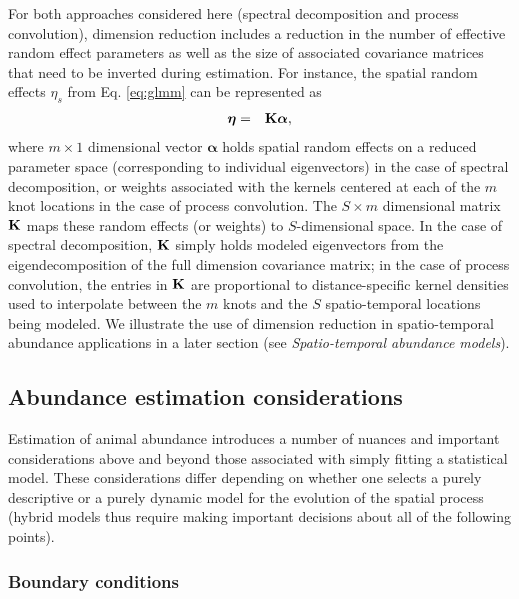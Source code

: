 \documentclass[12pt,english]{article}
\begin{document}
\begin{spacing}{1.9}
For both approaches considered here (spectral decomposition and process convolution), dimension reduction includes a reduction in the number of effective random effect parameters as well as the size of associated covariance matrices that need to be inverted during estimation.  For instance, the spatial random effects $\eta_s$ from Eq. \ref{eq:glmm} can be represented as
\begin{eqnarray}
   \boldsymbol{\eta} & = & {\bf K} \boldsymbol{\alpha},
 \label{eq:reduced-spat}
\end{eqnarray}
where $m \times 1$ dimensional vector $\boldsymbol{\alpha}$ holds spatial random effects on a reduced parameter space (corresponding to individual eigenvectors) in the case of spectral decomposition, or weights associated with the kernels centered at each of the $m$ knot locations in the case of process convolution. The $S \times m$ dimensional matrix ${\bf K}$ maps these random effects (or weights) to $S$-dimensional space.  In the case of spectral decomposition, ${\bf K}$ simply holds modeled eigenvectors from the eigendecomposition of the full dimension covariance matrix; in the case of process convolution, the entries in ${\bf K}$ are proportional to distance-specific kernel densities used to interpolate between the $m$ knots and the $S$ spatio-temporal locations being modeled.  We illustrate the use of dimension reduction in spatio-temporal abundance applications in a later section (see {\it Spatio-temporal abundance models}).

\subsection{Abundance estimation considerations}

Estimation of animal abundance introduces a number of nuances and important considerations above and beyond those associated with simply fitting a statistical model.  These considerations differ depending on whether one selects a purely descriptive or a purely dynamic model for the evolution of the spatial process (hybrid models thus require making important decisions about all of the following points).

\subsubsection{Boundary conditions}


\end{spacing}
\end{document}
